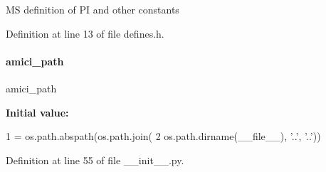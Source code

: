 MS definition of PI and other constants 

Definition at line 13 of file defines.\+h.

\mbox{\label{namespaceamici_a6b3f3dfe4601baaa0bf0a02b9a01a896}} 
\paragraph{\texorpdfstring{amici\+\_\+path}{amici\_path}}
{\footnotesize\ttfamily amici\+\_\+path}

{\bfseries Initial value\+:}
\begin{DoxyCode}
1 =  os.path.abspath(os.path.join(
2         os.path.dirname(\_\_file\_\_), \textcolor{stringliteral}{'..'}, \textcolor{stringliteral}{'..'}))
\end{DoxyCode}


Definition at line 55 of file \+\_\+\+\_\+init\+\_\+\+\_\+.\+py.

